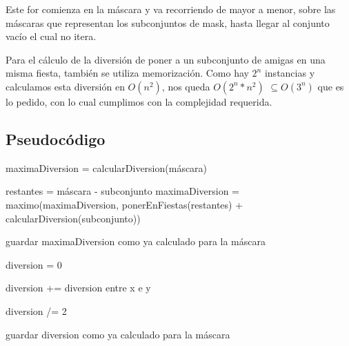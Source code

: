 Este for comienza en la máscara y va recorriendo de mayor a menor, sobre las máscaras que representan los subconjuntos de mask, hasta llegar al conjunto vacío el cual no itera. \newline

Para el cálculo de la diversión de poner a un subconjunto de amigas en una misma fiesta, también se utiliza memorización. Como hay $2^{n}$ instancias y calculamos esta diversión en $O(n^{2})$, nos queda $O(2^{n}*n^{2})$ $\subseteq O(3^{n})$ que es lo pedido, con lo cual cumplimos con la complejidad requerida.

\subsection{Pseudocódigo}

\begin{algorithmic}



    	\State {}
  	\EndIf		

    	\State {}
  	\EndIf	

  \State maximaDiversion = calcularDiversion(máscara) 

  	\State restantes = máscara - subconjunto  
  	\State maximaDiversion = maximo(maximaDiversion, ponerEnFiestas(restantes) + calcularDiversion(subconjunto))
  \EndFor

  \State guardar maximaDiversion como ya calculado para la máscara

 \State {}

\EndFunction

\end{algorithmic}

\vspace{5mm}


\begin{algorithmic}



    	\State {}
  	\EndIf		

  	\State diversion = 0

  			\State diversion += diversion entre x e y
  		\EndFor
  	\EndFor

  	\State diversion /= 2 

  	\State guardar diversion como ya calculado para la máscara

 	\State {}

\EndFunction

\end{algorithmic}
